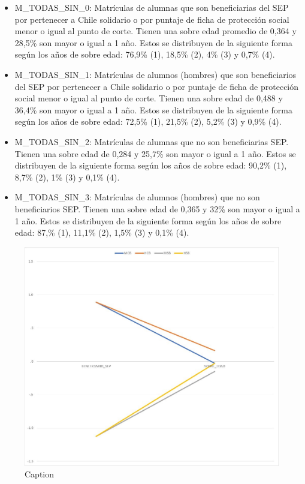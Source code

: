 \begin{itemize}
  \item M\_TODAS\_SIN\_0: Matrículas de alumnas que son beneficiarias del SEP por pertenecer a Chile solidario o por puntaje de ficha de protección social menor o igual al punto de corte. Tienen una sobre edad promedio de 0,364 y 28,5\% son mayor o igual a 1 año. Estos se distribuyen de la siguiente forma según los años de sobre edad: 76,9\% (1), 18,5\% (2), 4\% (3) y 0,7\% (4).
  \item M\_TODAS\_SIN\_1: Matrículas de alumnos (hombres) que son beneficiarios del SEP por pertenecer a Chile solidario o por puntaje de ficha de protección social menor o igual al punto de corte. Tienen una sobre edad de 0,488 y 36,4\% son mayor o igual a 1 año. Estos se distribuyen de la siguiente forma según los años de sobre edad: 72,5\% (1), 21,5\% (2), 5,2\% (3) y 0,9\% (4).
  \item M\_TODAS\_SIN\_2: Matrículas de alumnas que no son beneficiarias SEP. Tienen una sobre edad de 0,284 y 25,7\% son mayor o igual a 1 año. Estos se distribuyen de la siguiente forma según los años de sobre edad: 90,2\% (1), 8,7\% (2), 1\% (3) y 0,1\% (4).

  \item M\_TODAS\_SIN\_3: Matrículas de alumnos (hombres) que no son beneficiarios SEP. Tienen una sobre edad de 0,365 y 32\% son mayor o igual a 1 año. Estos se distribuyen de la siguiente forma según los años de sobre edad: 87,\% (1), 11,1\% (2), 1,5\% (3) y 0,1\% (4).
\end{itemize}

\begin{figure}[H]
    \centering
    \includegraphics[width=\textwidth]{images/chart_matriculas_sin.jpg}
    \caption{Caption}
    \label{fig:my_label}
\end{figure}

